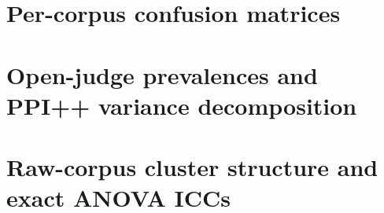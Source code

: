 \documentclass[11pt]{article}
\begin{document}
\section{Per-corpus confusion matrices}
\label{app:confusion}

\begin{table}[h]
\centering\footnotesize

\caption{Per-corpus confusion matrices ($n = \vernierNPrimary{}$) for both the vendor's stored
\texttt{gemini-2.5-flash} labels and \texttt{Qwen3-VL}. On EPIC-KITCHENS-100 manipulation,
\texttt{gemini-2.5-flash} records 1 over-call (TF) against 2 under-calls (FT), reversing the
pooled direction.}
\label{tab:conf}
\end{table}

\section{Open-judge prevalences and PPI++ variance decomposition}
\label{app:ppivar}

\begin{table}[h]
\centering\footnotesize

\caption{Gold-corrected prevalences using the live open judge (\texttt{Qwen3-VL}) over the
200-frame gold pools ($N \approx 140$ unlabelled frames per corpus). Intervals are iid lower
bounds on width.}
\label{tab:prev}
\end{table}

\begin{table}[h]
\centering\footnotesize

\caption{PPI++ variance decomposition for both the vendor full arm ($N = 9{,}800$) and the
open-judge pool ($N \approx 140$). Moving from $N \approx 140$ to $N = 9{,}800$ collapses the
iid unlabelled variance share from 20--45\% to under 1\%, leaving gold sample size (and, under
clustering, the cluster variance floor) as the binding constraint.}
\label{tab:ppivar}
\end{table}

\section{Raw-corpus cluster structure and exact ANOVA ICCs}
\label{app:clusters}

\begin{table}[h]
\centering\footnotesize

\caption{Cluster-size distribution, Kish's unequal-cluster factor $\tilde{m} = \sum m_i^2 / N$,
bootstrap design effect range, and exact one-way random-effects ANOVA $\hat{\rho}$ at both the
worker and factory levels on \texttt{S10k-U} ($n = 9{,}989$) and \texttt{S10k-S} ($n = 9{,}983$).
Because $\tilde{m}$ is nearly twice $\bar{m}$ at both levels, unequal cluster sizes account for a
substantial share of the measured design effects.}
\label{tab:clusterdetail}
\end{table}



\end{document}
